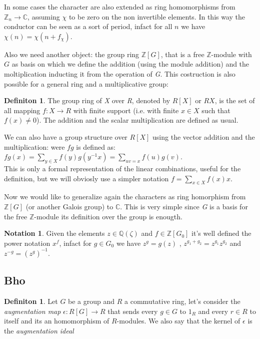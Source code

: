 \documentclass[]{article}
\theoremstyle{plain}
\theoremstyle{remark}
\theoremstyle{definition}
\newtheorem{deff}[teo]{Definiton}
\newtheorem*{nota}{Notation}
\newcommand{\Z}{\mathbb{Z}}
\newcommand{\Q}{\mathbb{Q}}
\newcommand{\C}{\mathbb{C}}
\begin{document}
	 In some cases the character are also extended as ring homomorphisms from $ \Z_n \to \C $, assuming $ \chi $ to be zero on the non invertible elements. In this way the conductor can be seen as a sort of period, infact for all $ n $ we have $ \chi(n)=\chi(n+f_\chi) $. 
	 
	 Also we need another object: the group ring $ \Z[G] $, that is a free $ \Z $-module with $ G $ as basis on which we define the addition (using the module addition)  and the moltiplication inducting it from the operation of \textit{G}.
	 This costruction is also possible for a general ring and a multiplicative group:
	 
	 \begin{deff}
	 	The group ring of \textit{X} over \textit{R}, denoted by $ R[X] $ or $ RX $, is the set of all mapping $ f : X \to R $ with finite support (i.e. with finite $ x \in X $ such that $ f(x) \neq 0 $). The addition and the scalar multiplication are defined as usual. 
	 \end{deff}
 
 	We can also have a group structure over $ R[X] $ using the vector addition and the multiplication: were $ fg $ is defined as: $ fg(x) = \sum_{ y \in X } f(y)g(y^{-1}x) = \sum_{uv = x} f(u)g(v)$.\\
 	This is only a formal representation of the linear combinations, useful for the definition, but we will obviosly use a simpler notation $ f = \sum_{x \in X} f(x) x $.
 	
 	Now we would like to generalize again the characters as ring homorphism from $ \Z[G] $ (or another Galois group) to $ \C $. This is very simple since \textit{G} is a basis for the free $ \Z $-module its definition over the group is enougth. 
	
	\begin{nota}
		Given the elements $ z \in \Q (\zeta) $ and $ f \in \Z[G_0]  $ it's well defined the power notation $ x^f $, infact for $ g\in G_0 $ we have $ z^g = g(z) $ , $ z ^{g_1 + g_2}= z^{g_1} z^{g_2} $ and $ z^{-g} = (z^g)^{-1} $. 
	\end{nota}
	
	\subsection{Bho}
	\begin{deff}
		Let $ G $ be a group and $ R $ a commutative ring, let's consider the \textit{augmentation map} $\epsilon : R[G] \to R$ that sends every $ g \in G $ to $ 1_R $ and every $ r \in R $ to itself and its an homomorphism of $ R $-modules. We also say that the kernel of $\epsilon$ is the \textit{augmentation ideal}
	\end{deff}
\end{document}
